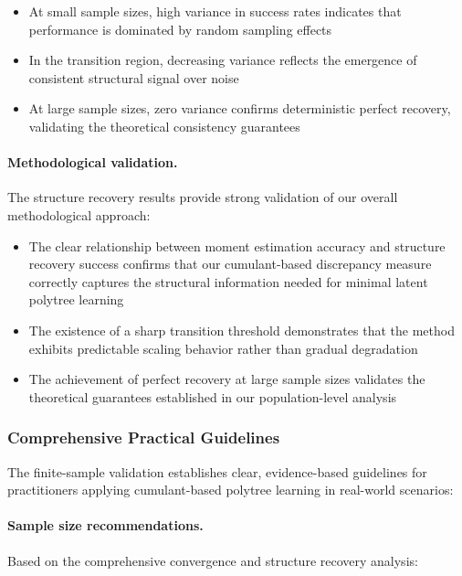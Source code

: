 \documentclass[11pt,a4paper]{article}
\numberwithin{equation}{section}
\begin{document}
\begin{itemize}
\item At small sample sizes, high variance in success rates indicates that performance is dominated by random sampling effects
\item In the transition region, decreasing variance reflects the emergence of consistent structural signal over noise
\item At large sample sizes, zero variance confirms deterministic perfect recovery, validating the theoretical consistency guarantees
\end{itemize}

\paragraph{Methodological validation.} The structure recovery results provide strong validation of our overall methodological approach:

\begin{itemize}
\item The clear relationship between moment estimation accuracy and structure recovery success confirms that our cumulant-based discrepancy measure correctly captures the structural information needed for minimal latent polytree learning
\item The existence of a sharp transition threshold demonstrates that the method exhibits predictable scaling behavior rather than gradual degradation
\item The achievement of perfect recovery at large sample sizes validates the theoretical guarantees established in our population-level analysis
\end{itemize}

\subsubsection{Comprehensive Practical Guidelines}

The finite-sample validation establishes clear, evidence-based guidelines for practitioners applying cumulant-based polytree learning in real-world scenarios:

\paragraph{Sample size recommendations.} Based on the comprehensive convergence and structure recovery analysis:
\end{document}
